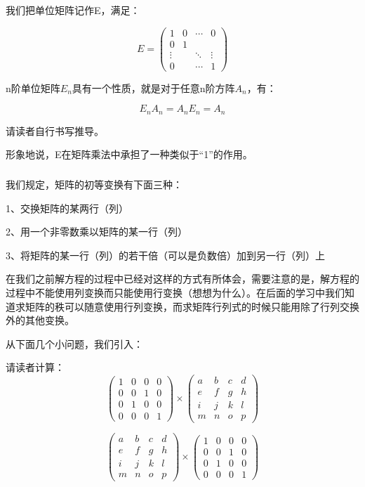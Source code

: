 \documentclass[12pt,a4paper]{book}
\begin{document}
我们把单位矩阵记作E，满足：

\[
E=
\begin{pmatrix}
1&0&\cdots&0\\
0&1&&\\
\vdots&&\ddots&\vdots\\
0&&\cdots&1
\end{pmatrix}
\]


n阶单位矩阵$E_n$具有一个性质，就是对于任意n阶方阵$A_n$，有：


\[ E_n A_n = A_n E_n = A_n \]

请读者自行书写推导。

形象地说，E在矩阵乘法中承担了一种类似于“1”的作用。

\vspace{10pt}
{\subsubsection{\centering\fontsize{15pt}{15pt}}}
我们规定，矩阵的初等变换有下面三种：

\vspace{10pt}

1、交换矩阵的某两行（列）

2、用一个非零数乘以矩阵的某一行（列）

3、将矩阵的某一行（列）的若干倍（可以是负数倍）加到另一行（列）上

\vspace{10pt}

在我们之前解方程的过程中已经对这样的方式有所体会，需要注意的是，解方程的过程中不能使用列变换而只能使用行变换（想想为什么）。在后面的学习中我们知道求矩阵的秩可以随意使用行列变换，而求矩阵行列式的时候只能用除了行列交换外的其他变换。

\vspace{10pt}

从下面几个小问题，我们引入：

请读者计算：
\[
\begin{pmatrix}
1&0&0&0\\
0&0&1&0\\
0&1&0&0\\
0&0&0&1
\end{pmatrix}
\times
\begin{pmatrix}
a&b&c&d\\
e&f&g&h\\
i&j&k&l\\
m&n&o&p
\end{pmatrix}
\]

\[
\begin{pmatrix}
a&b&c&d\\
e&f&g&h\\
i&j&k&l\\
m&n&o&p
\end{pmatrix}
\times
\begin{pmatrix}
1&0&0&0\\
0&0&1&0\\
0&1&0&0\\
0&0&0&1
\end{pmatrix}
\]
\end{document}

